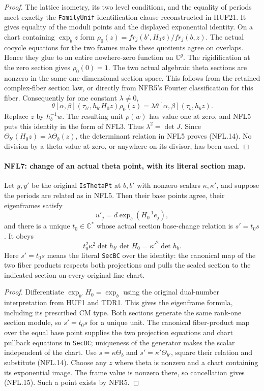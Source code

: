 \documentclass[11pt,a4paper]{article}
\numberwithin{equation}{section}
\theoremstyle{remark}\newtheorem{remark}[theorem]{Remark}
\begin{document}
\begin{proof}
The lattice isometry, its two level conditions, and the equality
of periods meet exactly the \texttt{Family\allowbreak Unif} identification
clause reconstructed in HUF21.  It gives equality of the
moduli points and the displayed exponential identity.
On a chart containing $\exp_bz$ form
$\rho_0(z)=fr_j(b',H_0z)/fr_j(b,z)$.
The actual cocycle equations for the two frames make these
quotients agree on overlaps.  Hence they glue to an entire
nowhere-zero function on $\mathbb C^g$.  The rigidification at
the zero section gives $\rho_0(0)=1$.
The two actual algebraic theta sections are nonzero in the same
one-dimensional section space.  This follows from the retained
complex-fiber section law, or directly from NFR5's Fourier
classification for this fiber.  Consequently for one constant
$\lambda\ne0$,
\[
 \theta[\alpha,\beta](\tau_{b'},h_{b'}H_0z)\rho_0(z)
       =\lambda\theta[\alpha,\beta](\tau_b,h_bz).
\]
Replace $z$ by $h_b^{-1}w$.  The resulting unit $\rho(w)$ has
value one at zero, and NFL5 puts this identity in the form of
NFL3.  Thus $\lambda^2=\det J$.
Since $\Theta_{b'}(H_0z)=\lambda\Theta_b(z)$, the determinant
relation in NFL5 proves (NFL.14).  No division by a theta value
at zero, or anywhere on its divisor, has been used.
\end{proof}

\paragraph{NFL7: change of an actual theta point, with its literal section map.}
\label{claim:NFL7}
Let $y,y'$ be the original \texttt{Is\allowbreak Theta\allowbreak Pt} at $b,b'$ with
nonzero scalars $\kappa,\kappa'$, and suppose the periods are
related as in NFL5.  Then their base points agree, their eigenframes
satisfy
\[
 u'_j=d\exp_b(H_0^{-1}e_j),
\]
and there is a unique $t_0\in\mathbb C^*$ whose actual section
base-change relation is $s'=t_0s$.  It obeys
\[
 t_0^2\kappa^2\det h_{b'}\det H_0
       =\kappa'^2\det h_b.
 \tag{NFL.15}
\]
Here $s'=t_0s$ means the literal \texttt{Sec\allowbreak BC} over the identity:
the canonical map of the two fiber products respects both
projections and pulls the scaled section to the indicated section
on every original line chart.

\begin{proof}
Differentiate $\exp_{b'}H_0=\exp_b$ using the original
dual-number interpretation from HUF1 and TDR1.  This gives the
eigenframe formula, including its prescribed CM type.
Both sections generate the same rank-one section module, so
$s'=t_0s$ for a unique unit.  The canonical fiber-product map
over the equal base point supplies the two projection equations
and chart pullback equations in \texttt{Sec\allowbreak BC}; uniqueness of
the generator makes the scalar independent of the chart.
Use $s=\kappa\Theta_b$ and $s'=\kappa'\Theta_{b'}$, square their
relation and substitute (NFL.14).  Choose any $z$ where theta
is nonzero and a chart containing its exponential image.
The frame value is nonzero there, so cancellation gives
(NFL.15).  Such a point exists by NFR5.
\end{proof}
\end{document}
